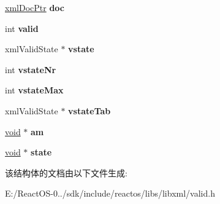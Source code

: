 \begin{DoxyCompactItemize}
\hyperlink{struct__xml_doc}{xml\+Doc\+Ptr} {\bfseries doc}
\item 
\mbox{\label{struct__xml_valid_ctxt_ac31686aaeedb48c46b453f98c51597d2}} 
int {\bfseries valid}
\item 
\mbox{\label{struct__xml_valid_ctxt_a70d2a592a1909a626ae50db98a9ed136}} 
xml\+Valid\+State $\ast$ {\bfseries vstate}
\item 
\mbox{\label{struct__xml_valid_ctxt_af1d9fbfcf068c8dad6349fd677effc22}} 
int {\bfseries vstate\+Nr}
\item 
\mbox{\label{struct__xml_valid_ctxt_a606af121a4d33a9ec572147b17682125}} 
int {\bfseries vstate\+Max}
\item 
\mbox{\label{struct__xml_valid_ctxt_a81fb3ed51e4a63ddaf5a7541f3563ebc}} 
xml\+Valid\+State $\ast$ {\bfseries vstate\+Tab}
\item 
\mbox{\label{struct__xml_valid_ctxt_adef83a3cd73508675a7b1246dc6e9dc1}} 
\hyperlink{interfacevoid}{void} $\ast$ {\bfseries am}
\item 
\mbox{\label{struct__xml_valid_ctxt_a88d110c3238a8766436bf8da59bf9d0c}} 
\hyperlink{interfacevoid}{void} $\ast$ {\bfseries state}
\end{DoxyCompactItemize}


该结构体的文档由以下文件生成\+:\begin{DoxyCompactItemize}
\item 
E\+:/\+React\+O\+S-\/0../sdk/include/reactos/libs/libxml/valid.\+h\end{DoxyCompactItemize}

